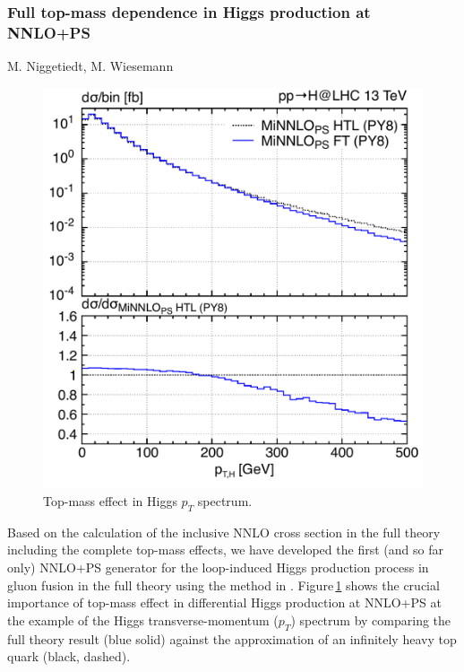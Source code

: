 \documentclass{FBR_Bericht_2025}
\begin{document}
\begin{refsection}
\subsubsection{Full top-mass dependence in Higgs production at NNLO+PS}
\begin{Namen}
M. Niggetiedt, M. Wiesemann
\end{Namen}

\begin{figure}[h!]
\begin{center}
\includegraphics[width=0.95\linewidth]{plots/ptH_diphotons_mass_effect.pdf}
\caption{Top-mass effect in Higgs $p_T$ spectrum.}
\label{fig:topmass_Higgs_pT}
\end{center}
\end{figure}
%
Based on the calculation of the inclusive NNLO cross section in the full theory
including the complete top-mass effects,
we have developed the first (and so far only) 
NNLO+PS generator for the loop-induced 
Higgs production process in gluon fusion in the full theory using 
the \minnlo{} method in . Figure\,\ref{fig:topmass_Higgs_pT} shows
the crucial importance of top-mass effect in differential Higgs production
at NNLO+PS at the example of the Higgs transverse-momentum ($p_T$)
spectrum by comparing the full theory result (blue solid) against
the approximation of an infinitely heavy top quark (black, dashed).


\end{refsection}
\end{document}
